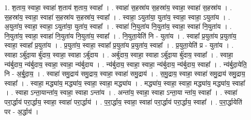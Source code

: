 \documentclass[17pt]{extarticle}
\begin{document}
1. श॒ताय॒ स्वाहा॒ स्वाहा॑ श॒ताय॑ श॒ताय॒ स्वाहा᳚ । . स्वाहा॑ स॒हस्रा॑य स॒हस्रा॑य॒ स्वाहा॒ स्वाहा॑ स॒हस्रा॑य । . स॒हस्रा॑य॒ स्वाहा॒ स्वाहा॑ स॒हस्रा॑य स॒हस्रा॑य॒ स्वाहा᳚ । . स्वाहा॒ ऽयुता॑या॒ युता॑य॒ स्वाहा॒ स्वाहा॒ ऽयुता॑य । . अ॒युता॑य॒ स्वाहा॒ स्वाहा॒ ऽयुता॑या॒ युता॑य॒ स्वाहा᳚ । . स्वाहा॑ नि॒युता॑य नि॒युता॑य॒ स्वाहा॒ स्वाहा॑ नि॒युता॑य । . नि॒युता॑य॒ स्वाहा॒ स्वाहा॑ नि॒युता॑य नि॒युता॑य॒ स्वाहा᳚ । . नि॒युता॒येति॑ नि - युता॑य । . स्वाहा᳚ प्र॒युता॑य प्र॒युता॑य॒ स्वाहा॒ स्वाहा᳚ प्र॒युता॑य । . प्र॒युता॑य॒ स्वाहा॒ स्वाहा᳚ प्र॒युता॑य प्र॒युता॑य॒ स्वाहा᳚ । . प्र॒युता॒येति॑ प्र - युता॑य । . स्वाहा ऽर्बु॑दा॒या र्बु॑दाय॒ स्वाहा॒ स्वाहा ऽर्बु॑दाय । . अर्बु॑दाय॒ स्वाहा॒ स्वाहा ऽर्बु॑दा॒या र्बु॑दाय॒ स्वाहा᳚ । . स्वाहा॒ न्य॑र्बुदाय॒ न्य॑र्बुदाय॒ स्वाहा॒ स्वाहा॒ न्य॑र्बुदाय । . न्य॑र्बुदाय॒ स्वाहा॒ स्वाहा॒ न्य॑र्बुदाय॒ न्य॑र्बुदाय॒ स्वाहा᳚ । . न्य॑र्बुदा॒येति॒ नि - अ॒र्बु॒दा॒य॒ । . स्वाहा॑ समु॒द्राय॑ समु॒द्राय॒ स्वाहा॒ स्वाहा॑ समु॒द्राय॑ । . स॒मु॒द्राय॒ स्वाहा॒ स्वाहा॑ समु॒द्राय॑ समु॒द्राय॒ स्वाहा᳚ । . स्वाहा॒ मद्ध्या॑य॒ मद्ध्या॑य॒ स्वाहा॒ स्वाहा॒ मद्ध्या॑य । . मद्ध्या॑य॒ स्वाहा॒ स्वाहा॒ मद्ध्या॑य॒ मद्ध्या॑य॒ स्वाहा᳚ । . स्वाहा ऽन्ता॒यान्ता॑य॒ स्वाहा॒ स्वाहा ऽन्ता॑य । . अन्ता॑य॒ स्वाहा॒ स्वाहा ऽन्ता॒या न्ता॑य॒ स्वाहा᳚ । . स्वाहा॑ परा॒र्द्धाय॑ परा॒र्द्धाय॒ स्वाहा॒ स्वाहा॑ परा॒र्द्धाय॑ । . प॒रा॒र्द्धाय॒ स्वाहा॒ स्वाहा॑ परा॒र्द्धाय॑ परा॒र्द्धाय॒ स्वाहा᳚ । . प॒रा॒र्द्धायेति॑ पर - अ॒र्द्धाय॑ । \newline
\end{document}
